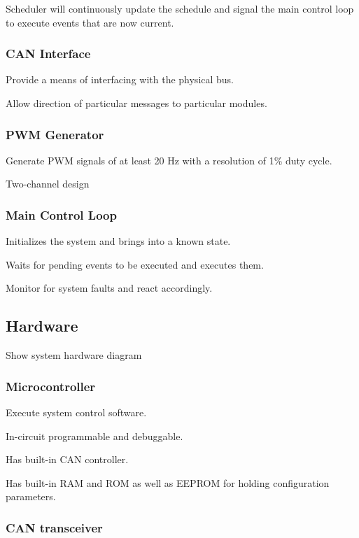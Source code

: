 Scheduler will continuously update the schedule and signal the main control loop to execute events that are now current.


\subsubsection{CAN Interface}

Provide a means of interfacing with the physical bus. 

Allow direction of particular messages to particular modules.


\subsubsection{PWM Generator}

Generate PWM signals of at least 20 Hz with a resolution of 1\% duty
cycle.

Two-channel design


\subsubsection{Main Control Loop}

Initializes the system and brings into a known state.

Waits for pending events to be executed and executes them.

Monitor for system faults and react accordingly.


\subsection{Hardware}

Show system hardware diagram


\subsubsection{Microcontroller}

Execute system control software.

In-circuit programmable and debuggable.

Has built-in CAN controller.

Has built-in RAM and ROM as well as EEPROM for holding configuration parameters.


\subsubsection{CAN transceiver}


